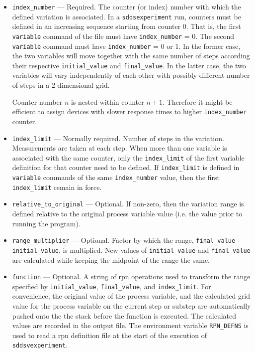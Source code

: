 \begin{itemize}
\begin{itemize}
\begin{itemize}
   \item {\verb+index_number+} --- Required. The counter (or index)
      number with which the defined variation is associated. In a
      \verb+sddsexperiment+ run, counters must be defined in an
      increasing sequence starting from counter 0. That is, the first
      {\verb+variable+} command of the file must have
      {\verb+index_number+} = 0. The second {\verb+variable+} command
      must have {\verb+index_number+} = 0 or 1. In the former case,
      the two variables will move together with the same number of
      steps according their respective {\verb+initial_value+} and
      {\verb+final_value+}. In the latter case, the two variables will
      vary independently of each other with possibly different number
      of steps in a 2-dimensional grid.

      Counter number $n$ is nested within counter $n+1$. Therefore it
      might be efficient to assign devices with slower response times
      to higher \verb+index_number+ counter.

   \item {\verb+index_limit+} --- Normally required.  Number of steps
      in the variation. Measurements are taken at each step.  When
      more than one variable is associated with the same counter, only
      the {\verb+index_limit+} of the first variable definition for
      that counter need to be defined.  If {\verb+index_limit+} is
      defined in {\verb+variable+} commands of the same
      {\verb+index_number+} value, then the first {\verb+index_limit+}
      remain in force.

   \item {\verb+relative_to_original+} --- Optional. If non-zero, then
      the variation range is defined relative to the original process
      variable value (i.e. the value prior to running the program).

   \item {\verb+range_multiplier+} --- Optional. Factor by which the
      range, {\verb+final_value+} - {\verb+initial_value+}, is
      multiplied.  New values of {\verb+initial_value+} and
      {\verb+final_value+} are calculated while keeping the midpoint
      of the range the same.

   \item {\verb+function+} --- Optional. A string of rpn operations
      used to transform the range specified by {\verb+initial_value+},
      {\verb+final_value+}, and {\verb+index_limit+}. For convenience,
      the original value of the process variable, and the calculated
      grid value for the process variable on the current step or
      substep are automatically pushed onto the the stack before the
      function is executed. The calculated values are recorded in the
      output file. The environment variable \verb+RPN_DEFNS+ is used
      to read a rpn definition file at the start of the execution of
      \verb+sddsvexperiment+.


\end{itemize}
\end{itemize}
\end{itemize}

